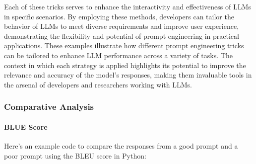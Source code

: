 \documentclass[
]{agujournal2019}
\let\oldparagraph\paragraph
\renewcommand{\paragraph}[1]{\oldparagraph{#1}\mbox{}}
\begin{document}
Each of these tricks serves to enhance the interactivity and
effectiveness of LLMs in specific scenarios. By employing these methods,
developers can tailor the behavior of LLMs to meet diverse requirements
and improve user experience, demonstrating the flexibility and potential
of prompt engineering in practical applications. These examples
illustrate how different prompt engineering tricks can be tailored to
enhance LLM performance across a variety of tasks. The context in which
each strategy is applied highlights its potential to improve the
relevance and accuracy of the model's responses, making them invaluable
tools in the arsenal of developers and researchers working with LLMs.

\subsubsection{Comparative Analysis}\label{comparative-analysis}

\paragraph{BLUE Score}\label{blue-score}

Here's an example code to compare the responses from a good prompt and a
poor prompt using the BLEU score in Python:
\end{document}
